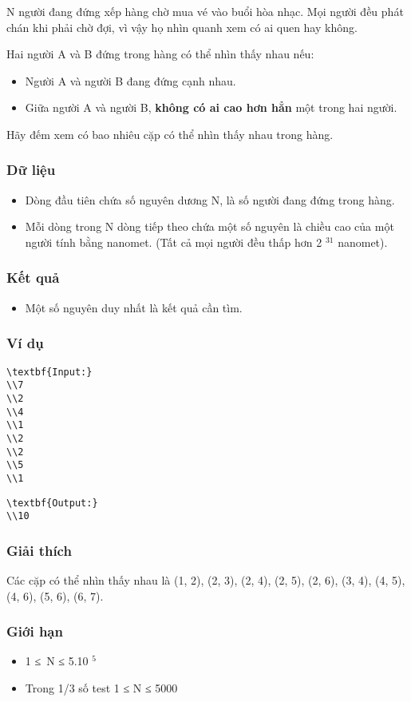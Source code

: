



   N người đang đứng xếp hàng chờ mua vé vào buổi hòa nhạc. Mọi người đều phát chán khi phải chờ đợi, vì vậy họ nhìn quanh xem có ai quen hay không.  

   Hai người A và B đứng trong hàng có thể nhìn thấy nhau nếu:  
\begin{itemize}
	\item     Người A và người B đang đứng cạnh nhau.   
	\item     Giữa người A và người B,    \textbf{     không có ai cao hơn hẳn    }    một trong hai người.   
\end{itemize}

   Hãy đếm xem có bao nhiêu cặp có thể nhìn thấy nhau trong hàng.  

\subsubsection{   Dữ liệu  }
\begin{itemize}
	\item     Dòng đầu tiên chứa số nguyên dương N, là số người đang đứng trong hàng.   
	\item     Mỗi dòng trong N dòng tiếp theo chứa một số nguyên là chiều cao của một người tính bằng nanomet. (Tất cả mọi người đều thấp hơn 2    $^     31    $    nanomet).   
\end{itemize}

\subsubsection{   Kết quả  }
\begin{itemize}
	\item     Một số nguyên duy nhất là kết quả cần tìm.   
\end{itemize}

\subsubsection{   Ví dụ  }
\begin{verbatim}
\textbf{Input:}
\\7
\\2
\\4
\\1
\\2
\\2
\\5
\\1 \end{verbatim}
\begin{verbatim}
\textbf{Output:}
\\10\end{verbatim}

\subsubsection{   Giải thích  }

   Các cặp có thể nhìn thấy nhau là (1, 2), (2, 3), (2, 4), (2, 5), (2, 6), (3, 4), (4, 5), (4, 6), (5, 6), (6, 7).  

\subsubsection{   Giới hạn  }
\begin{itemize}
	\item     1 ≤ N ≤ 5.10    $^     5    $
	\item     Trong 1/3 số test 1 ≤ N ≤ 5000   
\end{itemize}